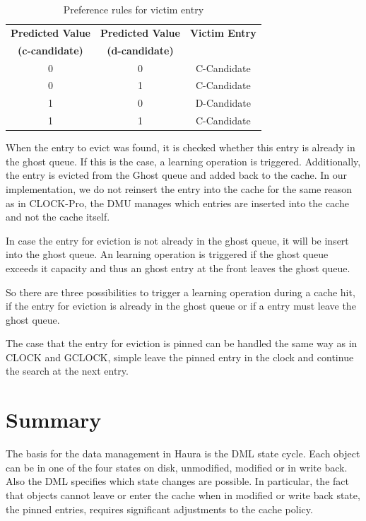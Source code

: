 \documentclass[
	12pt,
	a4paper,
	abstract,
	bibliography=totoc,
	chapterprefix,
	headings=openright,
	numbers=endperiod,
	parskip=half,
	twoside,
]{scrreprt}
\begin{document}
\begin{table}[ht]
	\centering
	\begin{tabular}{|c|c|c|}
		\hline
		\textbf{Predicted Value} & \textbf{Predicted Value} & \textbf{Victim Entry} \\
		\textbf{(c-candidate)} & \textbf{(d-candidate)} & \\
		\hline
		0 & 0 & C-Candidate \\
		\hline
		0 & 1 & C-Candidate \\
		\hline
		1 & 0 & D-Candidate \\
		\hline
		1 & 1 & C-Candidate \\
		\hline
	\end{tabular}
	\caption{Preference rules for victim entry \cite{cho2021ml}}
	\label{tab:ml-clock preference rules}
\end{table}


When the entry to evict was found,
it is checked whether this entry is already in the ghost queue.
If this is the case, a learning operation is triggered.
Additionally, the entry is evicted from the Ghost queue and added back to the cache.
In our implementation, we do not reinsert the entry into the cache for the same reason as in CLOCK-Pro, the DMU
manages which entries are inserted into the cache and not the cache itself.

In case the entry for eviction is not already in the ghost queue, it will be insert into the ghost queue.
An learning operation is triggered if the ghost queue exceeds it capacity and thus an ghost entry at the front leaves the ghost queue.

So there are three possibilities to trigger a learning operation during a cache hit, 
if the entry for eviction is already in the ghost queue or
if a entry must leave the ghost queue.

The case that the entry for eviction is pinned can be handled the same way as in CLOCK and GCLOCK, 
simple leave the pinned entry in the clock and continue the search at the next entry.


\section{Summary}

The basis for the data management in Haura is the DML state cycle.
Each object can be in one of the four states on disk, unmodified, modified or in write back.
Also the DML specifies which state changes are possible.
In particular, the fact that objects cannot leave or enter the cache when in modified or 
write back state, the pinned entries, requires significant adjustments to the cache policy.
\end{document}
